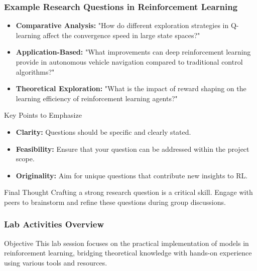 \documentclass[aspectratio=169]{beamer}
\begin{document}
\begin{frame}[fragile]
    \frametitle{Example Research Questions in Reinforcement Learning}
    \begin{itemize}
        \item \textbf{Comparative Analysis:} 
            "How do different exploration strategies in Q-learning affect the convergence speed in large state spaces?"
        
        \item \textbf{Application-Based:} 
            "What improvements can deep reinforcement learning provide in autonomous vehicle navigation compared to traditional control algorithms?"
        
        \item \textbf{Theoretical Exploration:} 
            "What is the impact of reward shaping on the learning efficiency of reinforcement learning agents?"
    \end{itemize}

    \begin{block}{Key Points to Emphasize}
        \begin{itemize}
            \item \textbf{Clarity:} Questions should be specific and clearly stated.
            \item \textbf{Feasibility:} Ensure that your question can be addressed within the project scope.
            \item \textbf{Originality:} Aim for unique questions that contribute new insights to RL.
        \end{itemize}
    \end{block}
    
    \begin{block}{Final Thought}
        Crafting a strong research question is a critical skill. Engage with peers to brainstorm and refine these questions during group discussions.
    \end{block}
\end{frame}

\begin{frame}
    \frametitle{Lab Activities Overview}
    \begin{block}{Objective}
        This lab session focuses on the practical implementation of models in reinforcement learning, bridging theoretical knowledge with hands-on experience using various tools and resources.
    \end{block}
\end{frame}
\end{document}
